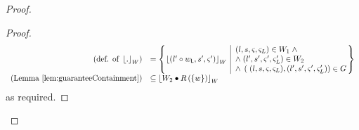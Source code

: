 \begin{lemma}
\begin{proof}
\begin{proof}
\[\begin{array}{r l}
	\left(\text{def. of } \reifyW{.} \right)
	& =
	\left\{
	\hspace*{-0.15cm}
	\begin{array}{l | l}
		\reifyW{\left(l' \composeL \localPart{w}, s', \amod{}' \right)}
		&
		\hspace*{-0.15cm}
		\begin{array}{l}
			(l, s, \amod{}, \amod{L}) \in W_1 \;\land\\ 
			\land\;(l', s', \amod{}', \amod{L}') \in W_2\\
			\land\; \left(\;(l, s, \amod{}, \amod{L}), (l', s', \amod{}', \amod{L}') \right) \in \guarantee
		\end{array}			
		\hspace*{-0.15cm}
	\end{array}
	\hspace*{-0.15cm}
	\right\}\\
	
	
	
	\left(\text{Lemma } \ref{lem:guaranteeContainment} \right)
	& 
	\subseteq	\reifyW{W_2 \composeW \rely\left( \{w\} \right)}

	
\end{array}
\]
%
as required.
\end{proof}
\renewcommand{\qed}{}
\end{proof}
\end{lemma}
%
%
